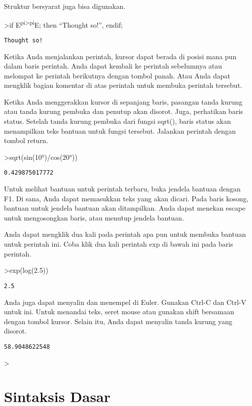 \documentclass[
]{book}
\begin{document}
Struktur bersyarat juga bisa digunakan.

\textgreater if E\textsuperscript{pi\textgreater pi}E; then ``Thought so!'', endif;

\begin{verbatim}
Thought so!
\end{verbatim}

Ketika Anda menjalankan perintah, kursor dapat berada di posisi mana pun dalam baris perintah. Anda dapat kembali ke perintah sebelumnya atau melompat ke perintah berikutnya dengan tombol panah. Atau Anda dapat mengklik bagian komentar di atas perintah untuk membuka perintah tersebut.

Ketika Anda menggerakkan kursor di sepanjang baris, pasangan tanda kurung atau tanda kurung pembuka dan penutup akan disorot. Juga, perhatikan baris status. Setelah tanda kurung pembuka dari fungsi sqrt(), baris status akan menampilkan teks bantuan untuk fungsi tersebut. Jalankan perintah dengan tombol return.

\textgreater sqrt(sin(10°)/cos(20°))

\begin{verbatim}
0.429875017772
\end{verbatim}

Untuk melihat bantuan untuk perintah terbaru, buka jendela bantuan dengan F1. Di sana, Anda dapat memasukkan teks yang akan dicari. Pada baris kosong, bantuan untuk jendela bantuan akan ditampilkan. Anda dapat menekan escape untuk mengosongkan baris, atau menutup jendela bantuan.

Anda dapat mengklik dua kali pada perintah apa pun untuk membuka bantuan untuk perintah ini. Coba klik dua kali perintah exp di bawah ini pada baris perintah.

\textgreater exp(log(2.5))

\begin{verbatim}
2.5
\end{verbatim}

Anda juga dapat menyalin dan menempel di Euler. Gunakan Ctrl-C dan Ctrl-V untuk ini. Untuk menandai teks, seret mouse atau gunakan shift bersamaan dengan tombol kursor. Selain itu, Anda dapat menyalin tanda kurung yang disorot.

\begin{verbatim}
58.9048622548
\end{verbatim}

\textgreater{}

\section{Sintaksis Dasar}\label{sintaksis-dasar}
\end{document}
